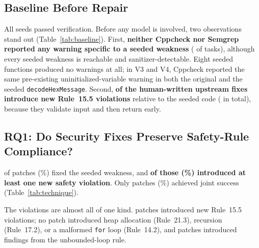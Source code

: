 \documentclass[12pt]{IEEEtran}
\begin{document}
\subsection{Baseline Before Repair}
All  seeds passed verification. Before any model is involved, two observations stand out (Table~\ref{tab:baseline}). First, \textbf{neither Cppcheck nor Semgrep reported any warning specific to a seeded weakness} ( of  tasks), although every seeded weakness is reachable and sanitizer-detectable. Eight seeded functions produced no warnings at all; in V3 and V4, Cppcheck reported the same pre-existing uninitialized-variable warning in both the original and the seeded \texttt{decodeHexMessage}. Second, \textbf{ of the  human-written upstream fixes introduce new Rule~15.5 violations} relative to the seeded code ( in total), because they validate input and then return early.



\subsection{RQ1: Do Security Fixes Preserve Safety-Rule Compliance?}
 of  patches (\%) fixed the seeded weakness, and \textbf{ of those (\%) introduced at least one new safety violation}. Only  patches (\%) achieved joint success (Table~\ref{tab:technique}).



The violations are almost all of one kind.  patches introduced  new Rule~15.5 violations; no patch introduced heap allocation (Rule~21.3), recursion (Rule~17.2), or a malformed \texttt{for} loop (Rule~14.2), and  patches introduced  findings from the unbounded-loop rule.
\end{document}
